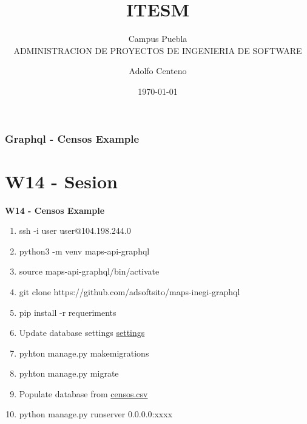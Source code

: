 \documentclass{beamer}
\begin{document}
\title{ITESM}  
\subtitle{Campus Puebla\\ADMINISTRACION DE PROYECTOS DE INGENIERIA DE SOFTWARE
}
\author{Adolfo Centeno}
\date{\today} 


\begin{frame}
\titlepage
\end{frame}

\begin{frame}\frametitle{Graphql -  Censos Example}
\tableofcontents
\end{frame} 


\section{W14 - Sesion }

\begin{frame}

    
\textbf{W14 - Censos Example}


\begin{enumerate}

\item
  ssh -i user user@104.198.244.0

\item
  python3 -m venv maps-api-graphql
  
\item
  source maps-api-graphql/bin/activate
  
\item
  git clone https://github.com/adsoftsito/maps-inegi-graphql  
  
\item
 pip install -r requeriments
 
\item
  Update database settings       
    \href{https://github.com/adsoftsito/maps-inegi-graphql/blob/master/maps-inegi-graphql/settings.py}{settings}

\item
  pyhton manage.py makemigrations
  
\item
  pyhton manage.py migrate
  
\item
 Populate database from  \href{https://github.com/adsoftsito/maps-inegi-graphql/blob/master/dataset/censos.csv}{censos.csv}

\item
  python manage.py runserver 0.0.0.0:xxxx  
  
  
 
\end{enumerate}

	


\end{frame}
\end{document}
